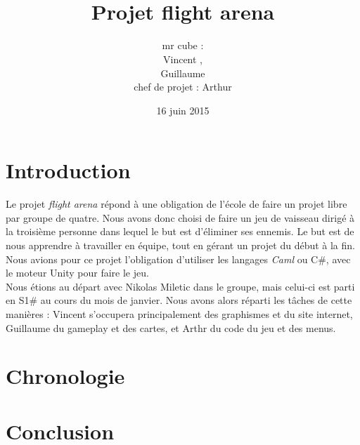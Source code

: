 \documentclass[12pt, titlepage]{article}
\title{\bsc{rapport de projet}\\Projet flight arena}
\author{mr cube :\\
Vincent \bsc{Rospini-Clerici},\\
Guillaume \bsc{Rebut}\\
chef de projet : Arthur \bsc{Remaud}}
\date{16 juin 2015}
\begin{document}
\begin{spacing}{1.5}

\maketitle

\renewcommand{\contentsname}{Sommaire}
\renewcommand{\chaptername}{Partie}

\tableofcontents

\newpage
\section*{Introduction}

Le projet \textit{flight arena} répond à une obligation de l'école  de faire un projet libre par groupe de quatre. Nous avons donc choisi de faire un jeu de vaisseau dirigé à la troisième personne dans lequel le but est d'éliminer ses ennemis. Le but est de nous apprendre à travailler en équipe, tout en gérant un projet du début à la fin.\\

Nous avions pour ce projet l'obligation d'utiliser les langages \textit{Caml} ou {C\#}, avec le moteur Unity pour faire le jeu.\\

Nous étions au départ avec Nikolas Miletic dans le groupe, mais celui-ci est parti en S1\# au cours du mois de janvier. Nous avons alors réparti les tâches de cette manières : Vincent s'occupera principalement des graphismes et du site internet, Guillaume du gameplay et des cartes, et Arthr du code du jeu et des menus.

\newpage
\section{Chronologie}

\newpage
\section*{Conclusion}

\end{spacing}
\end{document}
